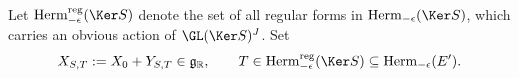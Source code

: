 \documentclass[11pt,a4paper]{amsart}
\newcommand{\g}{\mathfrak g}
\newcommand{\R}{\mathbb R}
\numberwithin{equation}{section}
\theoremstyle{remark}
\def\subset{\subseteq}
\begin{document}
 Let $\mathrm{Herm}_{-\epsilon}^{\mathrm{reg}}(\Ker S)$ denote the set of all regular forms in $\mathrm{Herm}_{-\epsilon}(\Ker S)$, which carries an obvious action of $\GL(\Ker S)^J$. 
Set \[
X_{S,T}:=X_0+Y_{S,T}\in \g_\R,\qquad T\in \mathrm{Herm}_{-\epsilon}^{\mathrm{reg}}(\Ker S)\subset \mathrm{Herm}_{-\epsilon}(E').
\]
\end{document}
